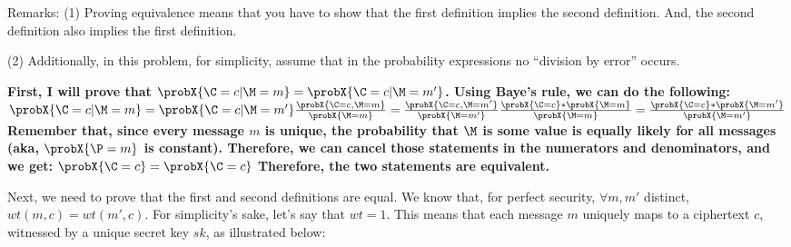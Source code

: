 \documentclass[11pt]{article}
\begin{document}
\begin{enumerate}
{\footnotesize Remarks: 
(1) Proving equivalence means that you have to show that the first definition implies the second definition. 
And, the second definition also implies the first definition.

(2) Additionally, in this problem, for simplicity, assume that in the probability expressions no ``division by error'' occurs.}

    {\bfseries
    First, I will prove that $ \probX{\C=c \vert \M=m} = \probX{\C = c \vert \M=m'}$. Using Baye's rule, we can do the following: \newline 
    $\probX{\C=c \vert \M=m} = \probX{\C=c \vert \M=m'} \newline
    \frac{\probX{\C=c , \M=m}}{\probX{\M=m}} = \frac{\probX{\C=c , \M=m'}}{\probX{\M=m'}} \newline
    \frac{\probX{\C=c}*\probX{\M=m}}{\probX{\M=m}} = \frac{\probX{\C=c}*\probX{\M=m'}}{\probX{\M=m'}}$ \newline
    Remember that, since every message $m$ is unique, the probability that $\M$ is some value is equally likely for all messages (aka, $\probX{\P=m}$ is constant). Therefore, we can cancel those statements in the numerators and denominators, and we get: \newline
    $\probX{\C=c} = \probX{\C=c}$ \newline
    Therefore, the two statements are equivalent. \newline

    Next, we need to prove that the first and second definitions are equal. We know that, for perfect security, $\forall m, m'$ distinct, $wt(m,c) = wt(m',c)$. For simplicity's sake, let's say that $wt = 1$. This means that each message $m$ uniquely maps to a ciphertext $c$, witnessed by a unique secret key $sk$, as illustrated below:

     \newline

}
\end{enumerate}
\end{document}
